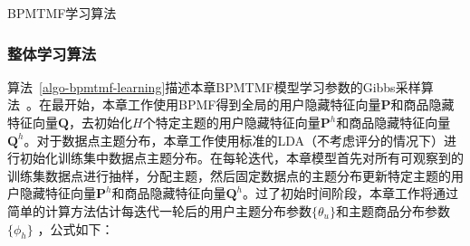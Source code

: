 \begin{algorithm}
 	
	\begin{algorithmic}[1]
		\caption{BPMTMF学习算法}
		\label{algo-bpmtmf-learning}
		

		
		\REPEAT 
		
		\ENDFOR
		
		
			
			\ENDFOR
			
			\ENDFOR
			
		\ENDFOR	

		
	\end{algorithmic}
\end{algorithm}

\subsubsection{整体学习算法}
算法~\ref{algo-bpmtmf-learning}描述本章BPMTMF模型学习参数的Gibbs采样算法~\cite{andrieu2003introduction}。在最开始，本章工作使用BPMF得到全局的用户隐藏特征向量$\mathbf{P}$和商品隐藏特征向量$\mathbf{Q}$，去初始化$H$个特定主题的用户隐藏特征向量$\mathbf{P}^{h}$和商品隐藏特征向量$\mathbf{Q}^{h}$。对于数据点主题分布，本章工作使用标准的LDA（不考虑评分的情况下）进行初始化训练集中数据点主题分布。在每轮迭代，本章模型首先对所有可观察到的训练集数据点进行抽样，分配主题，然后固定数据点的主题分布更新特定主题的用户隐藏特征向量$\mathbf{P}^{h}$和商品隐藏特征向量$\mathbf{Q}^{h}$。过了初始时间阶段，本章工作将通过简单的计算方法估计每迭代一轮后的用户主题分布参数$\{\theta_u\}$和主题商品分布参数$\{\phi_h\}$ ，公式如下：


